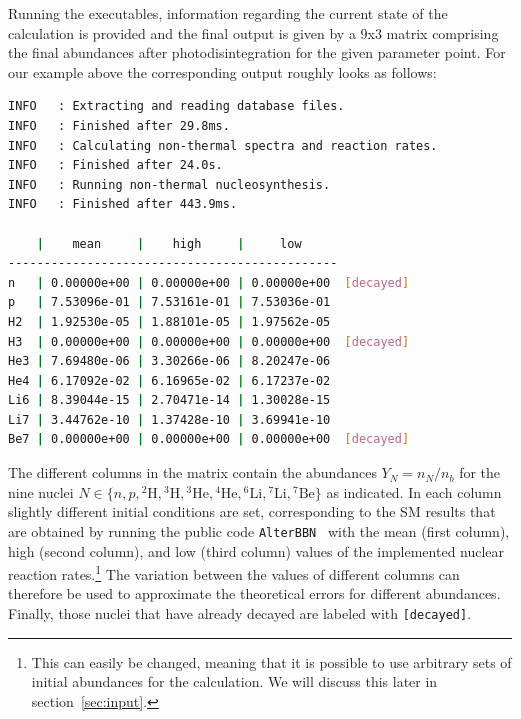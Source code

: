 \documentclass[11pt,a4paper]{article}
\begin{document}
Running the executables, information regarding the current state of the calculation is provided and the final output is given by a 9x3 matrix comprising the final abundances after photodisintegration for the given parameter point. For our example above the corresponding output roughly looks as follows:
\begin{lstlisting}[language=bash, backgroundcolor=\color{white}]
INFO   : Extracting and reading database files.
INFO   : Finished after 29.8ms.
INFO   : Calculating non-thermal spectra and reaction rates.
INFO   : Finished after 24.0s.
INFO   : Running non-thermal nucleosynthesis.
INFO   : Finished after 443.9ms.

    |    mean     |    high     |     low    
----------------------------------------------
n   | 0.00000e+00 | 0.00000e+00 | 0.00000e+00  [decayed]
p   | 7.53096e-01 | 7.53161e-01 | 7.53036e-01
H2  | 1.92530e-05 | 1.88101e-05 | 1.97562e-05
H3  | 0.00000e+00 | 0.00000e+00 | 0.00000e+00  [decayed]
He3 | 7.69480e-06 | 3.30266e-06 | 8.20247e-06
He4 | 6.17092e-02 | 6.16965e-02 | 6.17237e-02
Li6 | 8.39044e-15 | 2.70471e-14 | 1.30028e-15
Li7 | 3.44762e-10 | 1.37428e-10 | 3.69941e-10
Be7 | 0.00000e+00 | 0.00000e+00 | 0.00000e+00  [decayed]

\end{lstlisting}
\vspace{5mm}
%
The different columns in the matrix contain the abundances $Y_N = n_N/n_b$ for the nine nuclei $N\in\{n, p, {}^2\text{H}, {}^3\text{H}, {}^3\text{He}, {}^4\text{He}, {}^6\text{Li}, {}^7\text{Li}, {}^7\text{Be}\}$ as indicated. In each column slightly different initial conditions are set,
corresponding to the SM results that are obtained by running the public code \texttt{AlterBBN}~\cite{Arbey:2011nf,Arbey:2018zfh} with the mean (first column), high (second column), and low (third column) values of the implemented nuclear reaction rates.\footnote{This can easily be changed, meaning that it is possible to use arbitrary sets of initial abundances for the calculation. We will discuss this later in section~\ref{sec:input}.}
The variation between the values of different columns can therefore be used to approximate the  theoretical errors for different abundances. Finally, those nuclei that have already decayed are labeled with \texttt{[decayed]}.
\end{document}
